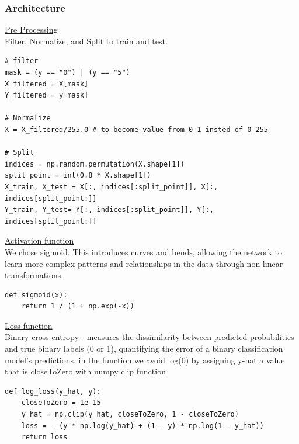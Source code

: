 \documentclass{article}
\begin{document}
\subsubsection{Architecture}
\underline{Pre Processing} \\ 
Filter, Normalize, and Split to train and test.
\begin{lstlisting}
# filter
mask = (y == "0") | (y == "5")
X_filtered = X[mask]
Y_filtered = y[mask]

# Normalize
X = X_filtered/255.0 # to become value from 0-1 insted of 0-255

# Split
indices = np.random.permutation(X.shape[1]) 
split_point = int(0.8 * X.shape[1])
X_train, X_test = X[:, indices[:split_point]], X[:, indices[split_point:]]
Y_train, Y_test= Y[:, indices[:split_point]], Y[:, indices[split_point:]]
\end{lstlisting} 

\underline{Activation function} \\
We chose sigmoid. This introduces curves and bends, allowing the network to learn more complex patterns and relationships in the data through non linear transformations.
\begin{lstlisting}
def sigmoid(x):
    return 1 / (1 + np.exp(-x))
\end{lstlisting}

\underline{Loss function} \\
Binary cross-entropy - measures the dissimilarity between predicted probabilities and true binary labels (0 or 1), quantifying the error of a binary classification model's predictions. in the function we avoid log(0) by assigning y-hat a value that is closeToZero with numpy clip function
\begin{lstlisting}
def log_loss(y_hat, y):
    closeToZero = 1e-15
    y_hat = np.clip(y_hat, closeToZero, 1 - closeToZero)
    loss = - (y * np.log(y_hat) + (1 - y) * np.log(1 - y_hat))
    return loss
\end{lstlisting}
\end{document}
